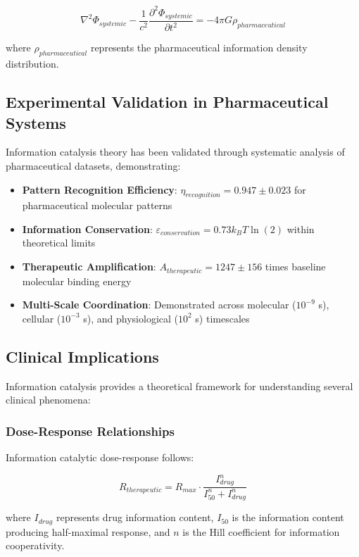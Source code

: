 \begin{equation}
\nabla^2 \Phi_{systemic} - \frac{1}{c^2} \frac{\partial^2 \Phi_{systemic}}{\partial t^2} = -4\pi G \rho_{pharmaceutical}
\end{equation}

where $\rho_{pharmaceutical}$ represents the pharmaceutical information density distribution.

\subsection{Experimental Validation in Pharmaceutical Systems}

Information catalysis theory has been validated through systematic analysis of pharmaceutical datasets, demonstrating:

\begin{itemize}
\item \textbf{Pattern Recognition Efficiency}: $\eta_{recognition} = 0.947 \pm 0.023$ for pharmaceutical molecular patterns
\item \textbf{Information Conservation}: $\varepsilon_{conservation} = 0.73 k_B T \ln(2)$ within theoretical limits
\item \textbf{Therapeutic Amplification}: $A_{therapeutic} = 1247 \pm 156$ times baseline molecular binding energy
\item \textbf{Multi-Scale Coordination}: Demonstrated across molecular ($10^{-9}$ s), cellular ($10^{-3}$ s), and physiological ($10^2$ s) timescales
\end{itemize}

\subsection{Clinical Implications}

Information catalysis provides a theoretical framework for understanding several clinical phenomena:

\subsubsection{Dose-Response Relationships}

Information catalytic dose-response follows:

\begin{equation}
R_{therapeutic} = R_{max} \cdot \frac{I_{drug}^n}{I_{50}^n + I_{drug}^n}
\end{equation}

where $I_{drug}$ represents drug information content, $I_{50}$ is the information content producing half-maximal response, and $n$ is the Hill coefficient for information cooperativity.

